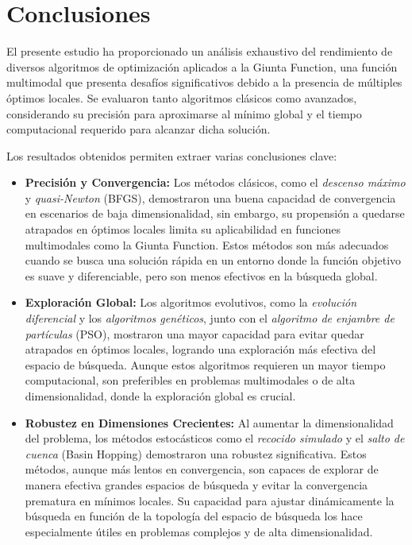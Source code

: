 \documentclass[fontsize=10pt]{article}
\begin{document}
\section{Conclusiones}

El presente estudio ha proporcionado un análisis exhaustivo del rendimiento de diversos algoritmos de optimización aplicados a la Giunta Function, una función multimodal que presenta desafíos significativos debido a la presencia de múltiples óptimos locales. Se evaluaron tanto algoritmos clásicos como avanzados, considerando su precisión para aproximarse al mínimo global y el tiempo computacional requerido para alcanzar dicha solución. 

Los resultados obtenidos permiten extraer varias conclusiones clave:

\begin{itemize}
    \item \textbf{Precisión y Convergencia:} Los métodos clásicos, como el \textit{descenso máximo} y \textit{quasi-Newton} (BFGS), demostraron una buena capacidad de convergencia en escenarios de baja dimensionalidad, sin embargo, su propensión a quedarse atrapados en óptimos locales limita su aplicabilidad en funciones multimodales como la Giunta Function. Estos métodos son más adecuados cuando se busca una solución rápida en un entorno donde la función objetivo es suave y diferenciable, pero son menos efectivos en la búsqueda global.

    \item \textbf{Exploración Global:} Los algoritmos evolutivos, como la \textit{evolución diferencial} y los \textit{algoritmos genéticos}, junto con el \textit{algoritmo de enjambre de partículas} (PSO), mostraron una mayor capacidad para evitar quedar atrapados en óptimos locales, logrando una exploración más efectiva del espacio de búsqueda. Aunque estos algoritmos requieren un mayor tiempo computacional, son preferibles en problemas multimodales o de alta dimensionalidad, donde la exploración global es crucial.

    \item \textbf{Robustez en Dimensiones Crecientes:} Al aumentar la dimensionalidad del problema, los métodos estocásticos como el \textit{recocido simulado} y el \textit{salto de cuenca} (Basin Hopping) demostraron una robustez significativa. Estos métodos, aunque más lentos en convergencia, son capaces de explorar de manera efectiva grandes espacios de búsqueda y evitar la convergencia prematura en mínimos locales. Su capacidad para ajustar dinámicamente la búsqueda en función de la topología del espacio de búsqueda los hace especialmente útiles en problemas complejos y de alta dimensionalidad.


\end{itemize}
\end{document}
